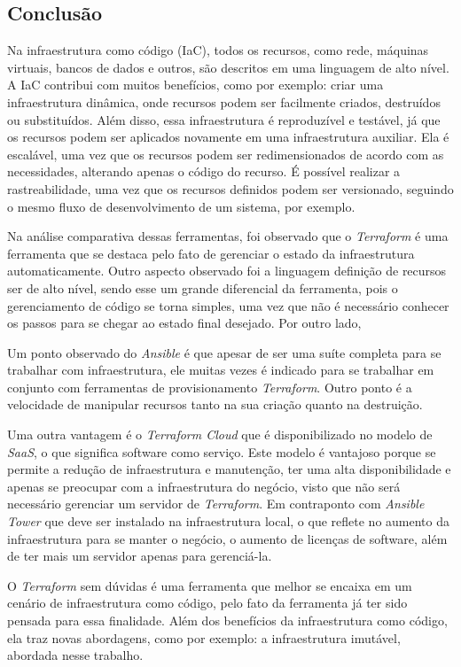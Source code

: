 \hfill

\subsection{Conclusão}
Na infraestrutura como código (IaC), todos os recursos, como rede, máquinas virtuais, bancos de dados e outros, são descritos em uma linguagem de alto nível. A IaC contribui com muitos benefícios, como por exemplo: criar uma infraestrutura dinâmica, onde recursos podem ser facilmente criados, destruídos ou substituídos. Além disso, essa infraestrutura é reproduzível e testável, já que os recursos podem ser aplicados novamente em uma infraestrutura auxiliar. Ela é escalável, uma vez que os recursos podem ser redimensionados de acordo com as necessidades, alterando apenas o código do recurso. É possível realizar a rastreabilidade, uma vez que os recursos definidos podem ser versionado, seguindo o mesmo fluxo de desenvolvimento de um sistema, por exemplo.

Na análise comparativa dessas ferramentas, foi observado que o \textit{Terraform} é uma ferramenta que se destaca pelo fato de gerenciar o estado da infraestrutura automaticamente. Outro aspecto observado foi a linguagem definição de recursos ser de alto nível, sendo esse um grande diferencial da ferramenta, pois o gerenciamento de código se torna simples, uma vez que não é necessário conhecer os passos para se chegar ao estado final desejado. Por outro lado,  

Um ponto observado do \textit{Ansible} é que apesar de ser uma suíte completa para se trabalhar com infraestrutura, ele muitas vezes é indicado para se trabalhar em conjunto com ferramentas de provisionamento \textit{Terraform}.  
Outro ponto é a velocidade de manipular recursos tanto na sua criação quanto na destruição. 

 Uma outra vantagem é o \textit{Terraform Cloud} que é disponibilizado no modelo de \textit{SaaS}, o que significa software como serviço. Este modelo é vantajoso porque se permite a redução de infraestrutura e manutenção, ter uma alta disponibilidade e apenas se preocupar com a infraestrutura do negócio, visto que não será necessário gerenciar um servidor de \textit{Terraform}. Em contraponto com \textit{Ansible Tower} que deve ser instalado na infraestrutura local, o que reflete no aumento da infraestrutura para se manter o negócio, o aumento de licenças de software, além de ter mais um servidor apenas para gerenciá-la. 

O \textit{Terraform} sem dúvidas é uma ferramenta que melhor se encaixa em um cenário de infraestrutura como código, pelo fato da ferramenta já ter sido pensada para essa finalidade. Além dos benefícios da infraestrutura como código, ela traz novas abordagens, como por exemplo: a infraestrutura imutável, abordada nesse trabalho.

